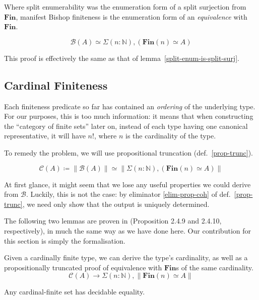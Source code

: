 Where split enumerability was the enumeration form of a split surjection from
\(\mathbf{Fin}\), manifest Bishop finiteness is the enumeration form of an
\emph{equivalence} with \(\mathbf{Fin}\).
\begin{lemma} \label{bishop-equiv}
  \begin{equation}
    \mathcal{B}(A) \simeq \Sigma {(n : \mathbb{N})} , \left( \mathbf{Fin}(n) \simeq A \right)
  \end{equation}
\end{lemma}
This proof is effectively the same as that of
lemma~\ref{split-enum-is-split-surj}.
\subsection{Cardinal Finiteness}
Each finiteness predicate so far has contained an \emph{ordering} of the
underlying type.
For our purposes, this is too much information: it means that when constructing
the ``category of finite sets'' later on, instead of each type having one
canonical representative, it will have \(n!\), where \(n\) is the cardinality of
the type\footnotemark.


To remedy the problem, we will use propositional truncation
(def.~\ref{prop-trunc}).
\begin{definition}
  \begin{equation}
    \mathcal{C}(A) \coloneqq \lVert \mathcal{B}(A) \rVert \simeq \lVert \Sigma(n : \mathbb{N}) , (\mathbf{Fin}(n) \simeq A) \rVert
  \end{equation}
\end{definition}
At first glance, it might seem that we lose any useful properties we could
derive from \(\mathcal{B}\).
Luckily, this is not the case: by eliminator \ref{elim-prop-coh} of
def.~\ref{prop-trunc}, we need only show that the output is uniquely determined.

The following two lemmas are proven in
\cite{yorgeyCombinatorialSpeciesLabelled2014} (Proposition 2.4.9 and 2.4.10,
respectively), in much the same way as we have done here.
Our contribution for this section is simply the formalisation.
\begin{lemma}
  Given a cardinally finite type, we can derive the type's cardinality, as well
  as a propositionally truncated proof of equivalence with \(\textbf{Fin}\)s of
  the same cardinality.
  \begin{equation}
    \mathcal{C}(A) \rightarrow \Sigma {(n : \mathbb{N})} , \lVert \textbf{Fin}(n) \simeq A \rVert
  \end{equation}
\end{lemma}
\begin{lemma} \label{cardinal-finite-discrete}
  Any cardinal-finite set has decidable equality.
\end{lemma}
